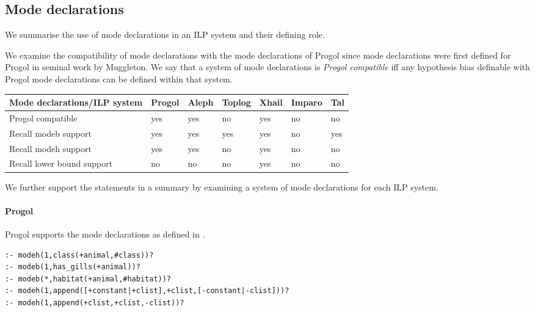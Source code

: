 \subsection{Mode declarations}\label{classification_mode_declarations}
We summarise the use of mode declarations in an ILP system and their defining role.

We examine the compatibility of mode declarations with the mode declarations of Progol since mode declarations were first defined for Progol in seminal work by Muggleton\cite{muggleton1995inverse}.
We say that a system of mode declarations is \emph{Progol compatible} iff any hypothesis bias definable with Progol mode declarations can be defined within that system.

\begin{center}
 \label{tab:classification_by_mode_declaration_bias} 
 \begin{tabular}{| l | l | l | l | l | l | l |}
    \hline
    Mode declarations/ILP system & Progol & Aleph & Toplog & Xhail & Imparo & Tal \\ \hline
    Progol compatible & yes & yes & no &  yes & no & no \\ \hline
    Recall modeb support & yes & yes & yes & yes & no & yes \\ \hline
    Recall modeh support & yes & yes & no & yes & no & no \\ \hline
    Recall lower bound support & no & no & no & yes & no & no \\ \hline
  \end{tabular}
  \end{center}

We further support the statements in a summary by examining a system of mode declarations for each ILP system.

\paragraph{Progol}
Progol supports the mode declarations as defined in .

\begin{exmp}\cite{muggleton1999progolWebsite}
\begin{lstlisting}
:- modeh(1,class(+animal,#class))?
:- modeb(1,has_gills(+animal))?
:- modeb(*,habitat(+animal,#habitat))?
:- modeh(1,append([+constant|+clist],+clist,[-constant|-clist]))?
:- modeh(1,append(+clist,+clist,-clist))?
\end{lstlisting}
\end{exmp}

